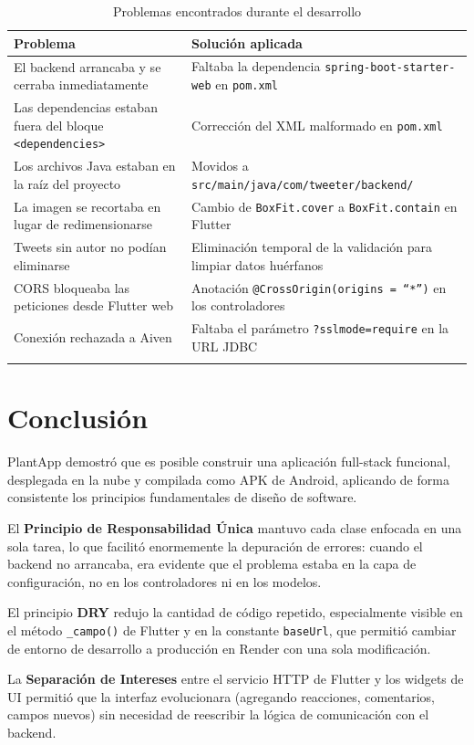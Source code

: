 \documentclass[12pt,a4paper]{article}
\begin{document}
\begin{longtable}{p{5cm} p{8cm}}
\toprule
\textbf{Problema} & \textbf{Solución aplicada} \\
\midrule
\endhead
El backend arrancaba y se cerraba inmediatamente & Faltaba la dependencia \texttt{spring-boot-starter-web} en \texttt{pom.xml} \\
Las dependencias estaban fuera del bloque \texttt{<dependencies>} & Corrección del XML malformado en \texttt{pom.xml} \\
Los archivos Java estaban en la raíz del proyecto & Movidos a \texttt{src/main/java/com/tweeter/backend/} \\
La imagen se recortaba en lugar de redimensionarse & Cambio de \texttt{BoxFit.cover} a \texttt{BoxFit.contain} en Flutter \\
Tweets sin autor no podían eliminarse & Eliminación temporal de la validación para limpiar datos huérfanos \\
CORS bloqueaba las peticiones desde Flutter web & Anotación \texttt{@CrossOrigin(origins = ``*'')} en los controladores \\
Conexión rechazada a Aiven & Faltaba el parámetro \texttt{?sslmode=require} en la URL JDBC \\
\bottomrule
\caption{Problemas encontrados durante el desarrollo}
\end{longtable}


\section{Conclusión}

PlantApp demostró que es posible construir una aplicación full-stack funcional, desplegada en la nube y compilada como APK de Android, aplicando de forma consistente los principios fundamentales de diseño de software.

El \textbf{Principio de Responsabilidad Única} mantuvo cada clase enfocada en una sola tarea, lo que facilitó enormemente la depuración de errores: cuando el backend no arrancaba, era evidente que el problema estaba en la capa de configuración, no en los controladores ni en los modelos.

El principio \textbf{DRY} redujo la cantidad de código repetido, especialmente visible en el método \texttt{\_campo()} de Flutter y en la constante \texttt{baseUrl}, que permitió cambiar de entorno de desarrollo a producción en Render con una sola modificación.

La \textbf{Separación de Intereses} entre el servicio HTTP de Flutter y los widgets de UI permitió que la interfaz evolucionara (agregando reacciones, comentarios, campos nuevos) sin necesidad de reescribir la lógica de comunicación con el backend.
\end{document}
